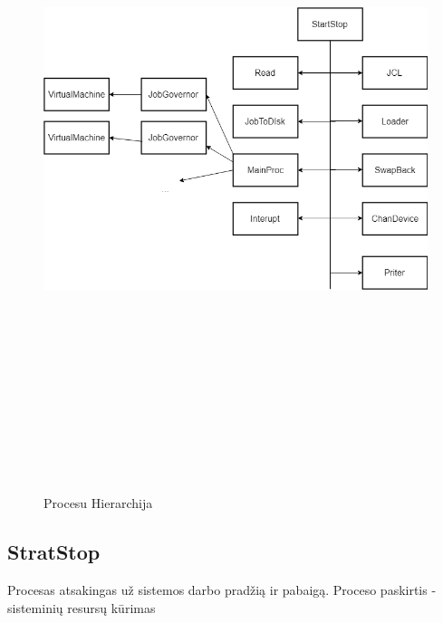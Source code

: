 \documentclass[oneside]{VUMIFPSkursinis}
\begin{document}
\begin{figure}[H]
		\centering	
	\includegraphics[width=18cm,height=20cm,keepaspectratio]{ProcesuHierarchija.png}
	\caption{Procesu Hierarchija}
	\label{fig:Procesu Hierarchija}
\end{figure}


\subsection{StratStop} Procesas atsakingas už sistemos darbo pradžią ir pabaigą. Proceso paskirtis - sisteminių resursų kūrimas
\end{document}
